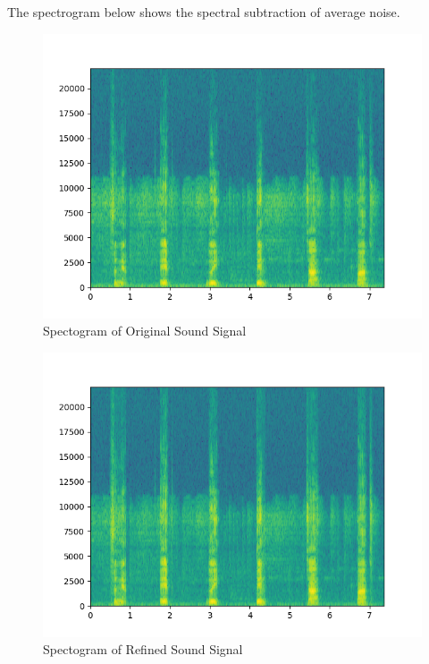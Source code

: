 The spectrogram below shows the spectral subtraction of average noise.
\begin{figure}[H]
	\begin{center}
		\includegraphics[scale=0.5]{images/main_Spectogram_Original.png}
		\caption{Spectogram of Original Sound Signal}
		\label{Spectro_original}
	\end{center}
\end{figure}

\begin{figure}[h]
	\begin{center}
		\includegraphics[scale=0.7]{images/MainSpectogram_Refine.png}
		\caption{Spectogram of Refined Sound Signal}
		\label{Spectro_refined}
	\end{center}
\end{figure}


